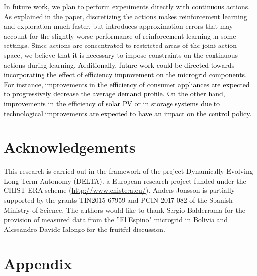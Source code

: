 \documentclass{article}
\begin{document}
	In future work, we plan to perform experiments directly with continuous actions. As explained in the paper, discretizing the actions makes reinforcement learning and exploration much faster, but introduces approximation errors that may account for the slightly worse performance of reinforcement learning in some settings. Since actions are concentrated to restricted areas of the joint action space, we believe that it is necessary to impose constraints on the continuous actions during learning. \textcolor{black}{Additionally, future work could be directed towards incorporating the effect of efficiency improvement on the microgrid components. For instance,  improvements in the efficiency of consumer appliances are expected to progressively decrease the average demand profile. On the other hand, improvements in the efficiency of solar PV or in storage systems due to technological improvements are expected to have an impact on the control policy.}

\section{Acknowledgements}
This research is carried out in the framework of the project Dynamically Evolving Long-Term Autonomy (DELTA), a European research project funded under the CHIST-ERA scheme (\url{http://www.chistera.eu/}). Anders Jonsson is partially supported by the grants TIN2015-67959 and PCIN-2017-082 of the Spanish Ministry of Science. The authors would like to thank Sergio Balderrama for the provision of measured data from the ''El Espino" microgrid in Bolivia and Alessandro Davide Ialongo for the fruitful discussion.






\section*{Appendix}
\end{document}
